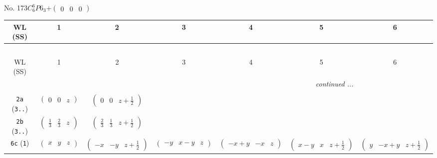 \documentclass[fleqn,9pt,landscape]{jsarticle}
\begin{document}
\newpage
No. 173\quad$C_{6}^{6}$\quad$P6_3$\quad[ hexagonal ]\quad$+\begin{pmatrix} 0 & 0 & 0 \end{pmatrix}$
\begin{center}
\renewcommand{\arraystretch}{1.2}
\begin{longtable}{ccccccc}
 \hline \hline
WL (SS) & 1 & 2 & 3 & 4 & 5 & 6 \\ \hline \endfirsthead

\multicolumn{6}{l}{\tablename\ \thetable{}} \\
 \hline \hline
WL (SS) & 1 & 2 & 3 & 4 & 5 & 6 \\ \hline \endhead

 \hline \hline
\multicolumn{6}{r}{\footnotesize\it continued ...} \\ \endfoot

 \hline \hline
\multicolumn{6}{r}{} \\ \endlastfoot

{\tt 2a} ({\tt 3..}) & $ \begin{pmatrix} 0 & 0 & z \end{pmatrix} $ & $ \begin{pmatrix} 0 & 0 & z + \frac{1}{2} \end{pmatrix} $ & $  $ & $  $ & $  $ & $  $ \\ \hline
{\tt 2b} ({\tt 3..}) & $ \begin{pmatrix} \frac{1}{3} & \frac{2}{3} & z \end{pmatrix} $ & $ \begin{pmatrix} \frac{2}{3} & \frac{1}{3} & z + \frac{1}{2} \end{pmatrix} $ & $  $ & $  $ & $  $ & $  $ \\ \hline
{\tt 6c} ({\tt 1}) & $ \begin{pmatrix} x & y & z \end{pmatrix} $ & $ \begin{pmatrix} - x & - y & z + \frac{1}{2} \end{pmatrix} $ & $ \begin{pmatrix} - y & x - y & z \end{pmatrix} $ & $ \begin{pmatrix} - x + y & - x & z \end{pmatrix} $ & $ \begin{pmatrix} x - y & x & z + \frac{1}{2} \end{pmatrix} $ & $ \begin{pmatrix} y & - x + y & z + \frac{1}{2} \end{pmatrix} $ \\
\end{longtable}
\end{center}
\end{document}
